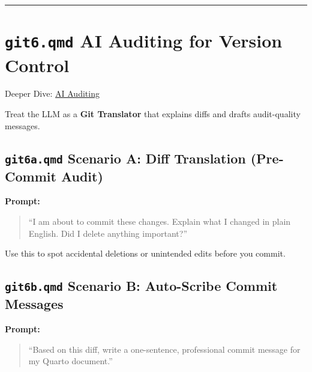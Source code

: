 \documentclass[
  letterpaper,
  DIV=11,
  numbers=noendperiod,
  oneside]{scrreprt}
\begin{document}
\begin{center}\rule{0.5\linewidth}{0.5pt}\end{center}

\section*{\texorpdfstring{\texttt{git6.qmd} AI Auditing for Version
Control}{git6.qmd AI Auditing for Version Control}}\label{git6.qmd-ai-auditing-for-version-control}


Deeper Dive: \href{git06-ai-auditing.qmd}{AI Auditing}

Treat the LLM as a \textbf{Git Translator} that explains diffs and
drafts audit-quality messages.

\subsection*{\texorpdfstring{\texttt{git6a.qmd} Scenario A: Diff
Translation (Pre-Commit
Audit)}{git6a.qmd Scenario A: Diff Translation (Pre-Commit Audit)}}\label{git6a.qmd-scenario-a-diff-translation-pre-commit-audit}

\textbf{Prompt:}

\begin{quote}
``I am about to commit these changes. Explain what I changed in plain
English. Did I delete anything important?''
\end{quote}

Use this to spot accidental deletions or unintended edits before you
commit.

\subsection*{\texorpdfstring{\texttt{git6b.qmd} Scenario B: Auto-Scribe
Commit
Messages}{git6b.qmd Scenario B: Auto-Scribe Commit Messages}}\label{git6b.qmd-scenario-b-auto-scribe-commit-messages}

\textbf{Prompt:}

\begin{quote}
``Based on this diff, write a one-sentence, professional commit message
for my Quarto document.''
\end{quote}
\end{document}
